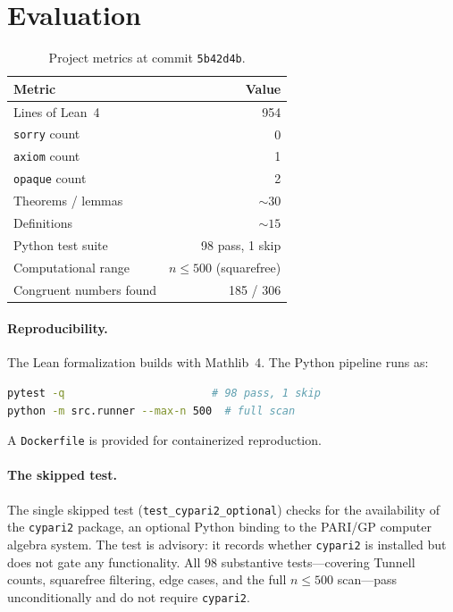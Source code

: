 \documentclass[11pt,a4paper]{article}
\theoremstyle{definition}
\newcommand{\lean}[1]{\texttt{#1}}
\begin{document}
\section{Evaluation}\label{sec:eval}

\begin{table}[ht]
\centering
\begin{tabular}{@{}lr@{}}
\toprule
\textbf{Metric} & \textbf{Value} \\
\midrule
Lines of Lean~4            & 954 \\
\lean{sorry} count         & 0 \\
\lean{axiom} count         & 1 \\
\lean{opaque} count        & 2 \\
Theorems / lemmas          & ${\sim}30$ \\
Definitions                & ${\sim}15$ \\
Python test suite          & 98 pass, 1 skip \\
Computational range        & $n \le 500$ (squarefree) \\
Congruent numbers found    & 185 / 306 \\
\bottomrule
\end{tabular}
\caption{Project metrics at commit \texttt{5b42d4b}.}
\label{tab:metrics}
\end{table}

\paragraph{Reproducibility.}
The Lean formalization builds with Mathlib~4.  The Python pipeline
runs as:
\begin{lstlisting}[language=bash,keywordstyle={},commentstyle={}]
pytest -q                       # 98 pass, 1 skip
python -m src.runner --max-n 500  # full scan
\end{lstlisting}
A \texttt{Dockerfile} is provided for containerized reproduction.

\paragraph{The skipped test.}
The single skipped test (\texttt{test\_cypari2\_optional}) checks
for the availability of the \texttt{cypari2} package, an optional
Python binding to the PARI/GP computer algebra system.
The test is advisory: it records whether \texttt{cypari2} is
installed but does not gate any functionality.  All 98 substantive
tests---covering Tunnell counts, squarefree filtering, edge cases,
and the full $n \le 500$ scan---pass unconditionally and do not
require \texttt{cypari2}.
\end{document}
